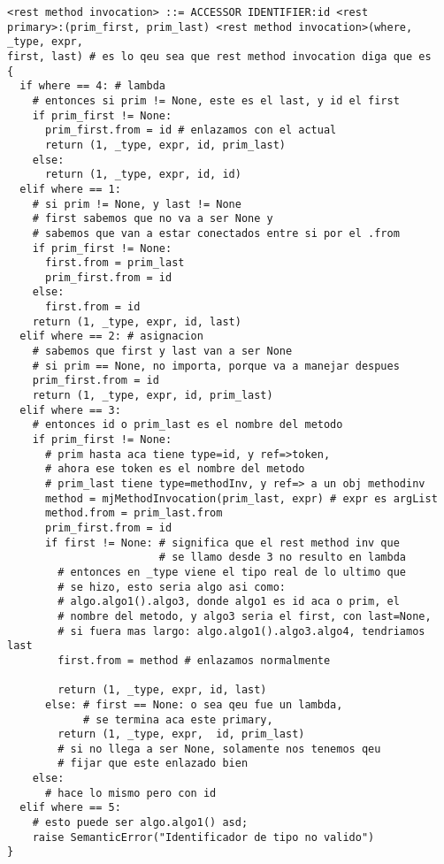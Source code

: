 \documentclass [a4paper,abstracton,titlepage]{scrartcl}
\begin{document}
\begin{lstlisting}
<rest method invocation> ::= ACCESSOR IDENTIFIER:id <rest
primary>:(prim_first, prim_last) <rest method invocation>(where, _type, expr,
first, last) # es lo qeu sea que rest method invocation diga que es
{
  if where == 4: # lambda
    # entonces si prim != None, este es el last, y id el first
    if prim_first != None:
      prim_first.from = id # enlazamos con el actual
      return (1, _type, expr, id, prim_last)
    else:
      return (1, _type, expr, id, id)
  elif where == 1:
    # si prim != None, y last != None
    # first sabemos que no va a ser None y 
    # sabemos que van a estar conectados entre si por el .from
    if prim_first != None:
      first.from = prim_last
      prim_first.from = id
    else:
      first.from = id
    return (1, _type, expr, id, last)
  elif where == 2: # asignacion
    # sabemos que first y last van a ser None
    # si prim == None, no importa, porque va a manejar despues
    prim_first.from = id
    return (1, _type, expr, id, prim_last)
  elif where == 3:
    # entonces id o prim_last es el nombre del metodo
    if prim_first != None:
      # prim hasta aca tiene type=id, y ref=>token, 
      # ahora ese token es el nombre del metodo
      # prim_last tiene type=methodInv, y ref=> a un obj methodinv
      method = mjMethodInvocation(prim_last, expr) # expr es argList
      method.from = prim_last.from
      prim_first.from = id
      if first != None: # significa que el rest method inv que 
                        # se llamo desde 3 no resulto en lambda
        # entonces en _type viene el tipo real de lo ultimo que 
        # se hizo, esto seria algo asi como:
        # algo.algo1().algo3, donde algo1 es id aca o prim, el 
        # nombre del metodo, y algo3 seria el first, con last=None,
        # si fuera mas largo: algo.algo1().algo3.algo4, tendriamos last
        first.from = method # enlazamos normalmente

        return (1, _type, expr, id, last)
      else: # first == None: o sea qeu fue un lambda, 
            # se termina aca este primary,
        return (1, _type, expr,  id, prim_last)
        # si no llega a ser None, solamente nos tenemos qeu 
        # fijar que este enlazado bien
    else:
      # hace lo mismo pero con id
  elif where == 5:
    # esto puede ser algo.algo1() asd;
    raise SemanticError("Identificador de tipo no valido") 
}


\end{lstlisting}
\end{document}
